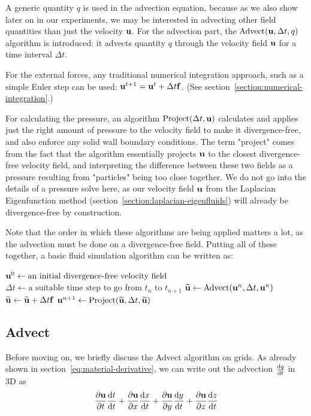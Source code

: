 A generic quantity $q$ is used in the advection equation, because as we also
show later on in our experiments, we may be interested in advecting other field
quantities than just the velocity $\vb{u}$. For the advection part, the
$\text{Advect}(\vb{u}, \Delta t, q)$ algorithm is introduced: it advects
quantity $q$ through the velocity field $\vb{u}$ for a time interval $\Delta t$. 

For the external forces, any traditional numerical integration approach, such as
a simple Euler step can be used: $\vb{u}^{t+1} = \vb{u}^t + \Delta t \vb{f}$.
(See section~\ref{section:numerical-integration}.)

For calculating the pressure, an algorithm $\text{Project}(\Delta t, \vb{u})$
calculates and applies just the right amount of pressure to the velocity field
to make it divergence-free, and also enforce any solid wall boundary
conditions. The term "project" comes from the fact that the algorithm
essentially projects $\vb{u}$ to the closest divergence-free velocity field, and
interpreting the difference between these two fields as a pressure resulting
from "particles" being too close together. We do not go into the details of a
pressure solve here, as our velocity field $\vb{u}$ from the Laplacian
Eigenfunction method (section~\ref{section:laplacian-eigenfluids}) will already
be divergence-free by construction. 

Note that the order in which these algorithms are being applied matters a lot,
as the advection must be done on a divergence-free field. Putting all of these
together, a basic fluid simulation algorithm can be written as:

\begin{algorithmic}
    \State $\vb{u}^0 \gets \text{an initial divergence-free velocity field}$
        \State $\Delta t 
            \gets \text{a suitable time step to go from $t_n$ to $t_{n+1}$}$
        \State $\widetilde{\vb{u}} 
            \gets \text{Advect}(\vb{u}^n,\Delta t, \vb{u}^n)$
        \State $\widetilde{\vb{u}} 
            \gets \widetilde{\vb{u}} + \Delta t \vb{f}$
        \State $\vb{u}^{n+1}
        \gets \text{Project}(\widetilde{\vb{u}},\Delta t, \widetilde{\vb{u}})$
            \EndFor {}
\end{algorithmic}

\subsection*{Advect}
Before moving on, we briefly discuss the Advect algorithm on grids. As already
shown in section~\ref{eq:material-derivative}, we can write out the advection 
$\dv{q}{t}$ in 3D as
$$\pdv{\vb{u}}{t}\dv{t}{t} 
                    + \pdv{\vb{u}}{x}\dv{x}{t} 
                    + \pdv{\vb{u}}{y}\dv{y}{t} 
                    + \pdv{\vb{u}}{z}\dv{z}{t}$$

